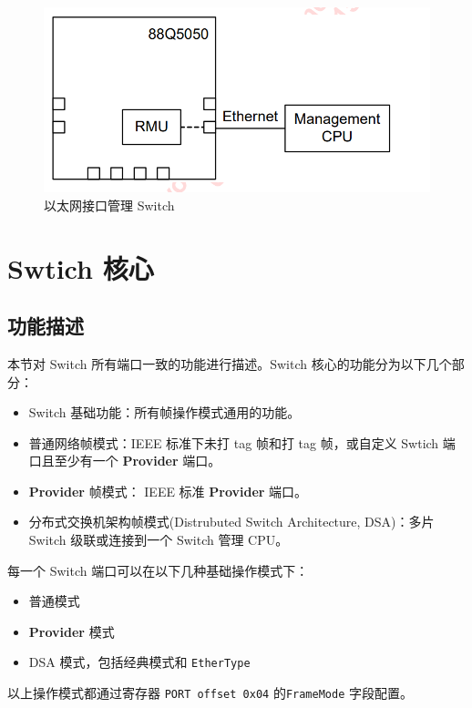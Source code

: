 \begin{figure}[ht]
    \centering
    \includegraphics[scale=0.7]{pic/Snipaste_2021-10-23_19-04-54.png}
    \caption{以太网接口管理 Switch}
    \label{fig:eth_interface}
\end{figure}

\section{Swtich 核心}
\subsection{功能描述} 
本节对 Switch 所有端口一致的功能进行描述。Switch 核心的功能分为以下几个部分：

\begin{itemize}
    \item Switch 基础功能：所有帧操作模式通用的功能。
    \item 普通网络帧模式：IEEE 标准下未打 tag 帧和打 tag 帧，或自定义 Swtich 端口且至少有一个 \textbf{Provider} 端口。
    \item \textbf{Provider} 帧模式： IEEE 标准 \textbf{Provider} 端口。
    \item 分布式交换机架构帧模式(Distrubuted Switch Architecture, DSA)：多片 Switch 级联或连接到一个 Switch 管理 CPU。
\end{itemize}

每一个 Switch 端口可以在以下几种基础操作模式下：
\begin{itemize}
    \item 普通模式
    \item \textbf{Provider} 模式
    \item DSA 模式，包括经典模式和 \lstinline{EtherType}
\end{itemize}

以上操作模式都通过寄存器 \lstinline{PORT offset 0x04} 的\lstinline{FrameMode} 字段配置。


